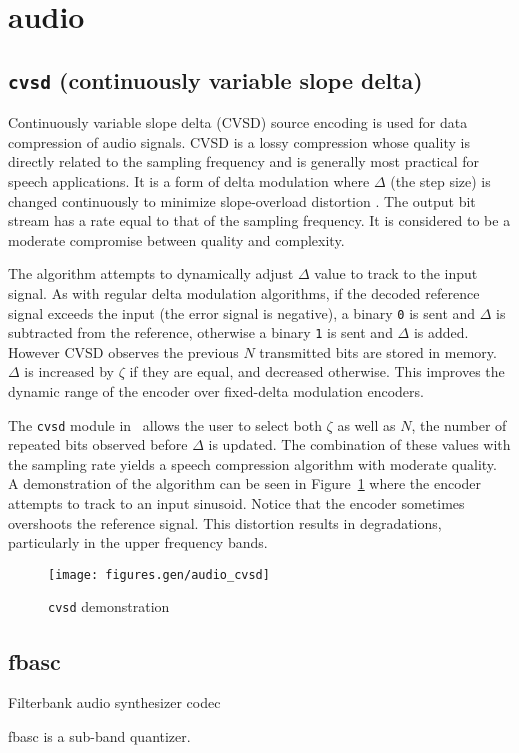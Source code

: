 % 
%
\section{audio}
\label{module:audio}

\subsection{{\tt cvsd} (continuously variable slope delta)}
\label{module:audio:cvsd}
Continuously variable slope delta (CVSD) source encoding is used for data
compression of audio signals.
CVSD is a lossy compression whose quality is directly related to the sampling
frequency and is generally most practical for speech applications.
It is a form of delta modulation where $\Delta$ (the step size) is changed
continuously to minimize slope-overload distortion \cite[p. 131]{Proakis:2001}.
The output bit stream has a rate equal to that of the sampling frequency.
It is considered to be a moderate compromise between quality and complexity.

The algorithm attempts to dynamically adjust $\Delta$ value to track
to the input signal.
As with regular delta modulation algorithms,
if the decoded reference signal exceeds the input (the error signal is
negative), a binary {\tt 0} is sent and $\Delta$ is subtracted from the
reference, otherwise a binary {\tt 1} is sent and $\Delta$ is added.
However CVSD observes the previous $N$ transmitted bits are stored in memory.
$\Delta$ is increased by $\zeta$ if they are equal, and decreased otherwise.
This improves the dynamic range of the encoder over fixed-delta modulation
encoders.

The {\tt cvsd} module in \liquid\ allows the user to select both $\zeta$
as well as $N$, the number of repeated bits observed before $\Delta$ is
updated.
The combination of these values with the sampling rate yields a speech
compression algorithm with moderate quality.
A demonstration of the algorithm can be seen in
Figure~\ref{fig:module:audio:cvsd} where the encoder attempts to track to an
input sinusoid.
Notice that the encoder sometimes overshoots the reference signal.
This distortion results in degradations, particularly in the upper frequency
bands.

\begin{figure}
\centering
  \texttt{[image: figures.gen/audio\_cvsd]}
\caption{{\tt cvsd} demonstration}
\label{fig:module:audio:cvsd}
\end{figure}

\subsection{fbasc}
\label{module:audio:fbasc}
Filterbank audio synthesizer codec

fbasc is a sub-band quantizer.

